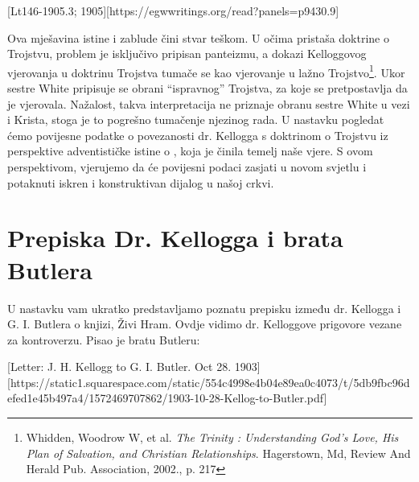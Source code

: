 [Lt146-1905.3; 1905][https://egwwritings.org/read?panels=p9430.9]

Ova mješavina istine i zablude čini stvar teškom. U očima pristaša doktrine o Trojstvu, problem je isključivo pripisan panteizmu, a dokazi Kelloggovog vjerovanja u doktrinu Trojstva tumače se kao vjerovanje u lažno Trojstvo\footnote{Whidden, Woodrow W, et al. \textit{The Trinity : Understanding God's Love, His Plan of Salvation, and Christian Relationships}. Hagerstown, Md, Review And Herald Pub. Association, 2002., p. 217}. Ukor sestre White pripisuje se obrani “ispravnog” Trojstva, za koje se pretpostavlja da je vjerovala. Nažalost, takva interpretacija ne priznaje obranu sestre White  u vezi  i Krista, stoga je to pogrešno tumačenje njezinog rada. U nastavku pogledat ćemo povijesne podatke o povezanosti dr. Kellogga s doktrinom o Trojstvu iz perspektive adventističke istine o , koja je činila temelj naše vjere. S ovom perspektivom, vjerujemo da će povijesni podaci zasjati u novom svjetlu i potaknuti iskren i konstruktivan dijalog u našoj crkvi.

\section*{Prepiska Dr. Kellogga i brata Butlera}

U nastavku vam ukratko predstavljamo poznatu prepisku između dr. Kellogga i G. I. Butlera o knjizi, Živi Hram. Ovdje vidimo dr. Kelloggove prigovore vezane za kontroverzu. Pisao je bratu Butleru:

[Letter: J. H. Kellogg to G. I. Butler. Oct 28. 1903][https://static1.squarespace.com/static/554c4998e4b04e89ea0c4073/t/5db9fbc96defed1e45b497a4/1572469707862/1903-10-28-Kellog-to-Butler.pdf]

